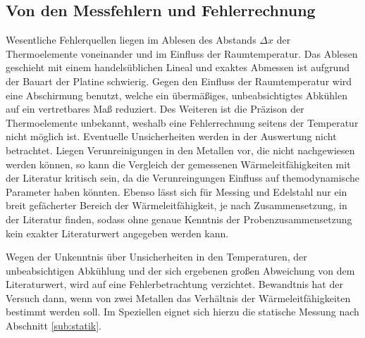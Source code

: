 \subsection{Von den Messfehlern und Fehlerrechnung}
Wesentliche Fehlerquellen liegen im Ablesen des Abstands $\Delta{x}$ der Thermoelemente voneinander und im Einfluss der Raumtemperatur.
Das Ablesen geschieht mit einem handelsüblichen Lineal und exaktes Abmessen ist aufgrund der Bauart der Platine schwierig. 
Gegen den Einfluss der Raumtemperatur wird eine Abschirmung benutzt, welche ein übermäßiges, unbeabsichtigtes Abkühlen auf ein vertretbares Maß reduziert. Des Weiteren ist die Präzison der Thermoelemente unbekannt, weshalb eine Fehlerrechnung seitens der Temperatur nicht möglich ist. Eventuelle Unsicherheiten werden in der Auswertung nicht betrachtet.
Liegen Verunreinigungen in den Metallen vor, die nicht nachgewiesen werden können, so kann die Vergleich der gemessenen Wärmeleitfähigkeiten mit der Literatur kritisch sein, 
da die Verunreingungen Einfluss auf themodynamische Parameter haben könnten. Ebenso lässt sich für Messing und Edelstahl nur ein breit gefächerter Bereich der Wärmeleitfähigkeit, je nach Zusammensetzung, in der Literatur finden, sodass ohne genaue Kenntnis der Probenzusammensetzung kein exakter Literaturwert angegeben werden kann.

Wegen der Unkenntnis über Unsicherheiten in den Temperaturen, der unbeabsichtigen Abkühlung und der sich ergebenen großen Abweichung von dem Literaturwert, wird auf eine Fehlerbetrachtung verzichtet. 
Bewandtnis hat der Versuch dann, wenn von zwei Metallen das Verhältnis der Wärmeleitfähigkeiten bestimmt werden soll. Im Speziellen eignet sich hierzu die statische Messung nach Abschnitt \ref{sub:statik}.

